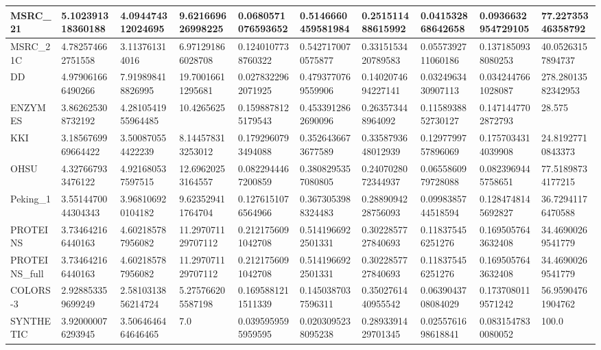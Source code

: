 \documentclass{article}
\begin{document}
\begin{table}[!ht]
\begin{tabular}{|l|l|l|l|l|l|l|l|l|l|}
        MSRC\_21 & 5.102391318360188 & 4.094474312024695 & 9.621669626998225 & 0.0680571076593652 & 0.5146660459581984 & 0.251511488615992 & 0.041532868642658 & 0.0936632954729105 & 77.22735346358792 \\ \hline
        MSRC\_21C & 4.782574662751558 & 3.113761314016 & 6.971291866028708 & 0.1240107738760322 & 0.5427170070575877 & 0.3315153420789583 & 0.0557392711060186 & 0.1371850938080253 & 40.05263157894737 \\ \hline
        DD & 4.979061666490266 & 7.919898418826995 & 19.70016611295681 & 0.0278322962071925 & 0.4793770769559906 & 0.1402074694227141 & 0.0324963430907113 & 0.0342447661028087 & 278.28013582342953 \\ \hline
        ENZYMES & 3.862625308732192 & 4.2810541955964485 & 10.4265625 & 0.1598878125179543 & 0.4533912862690096 & 0.263573448964092 & 0.1158938852730127 & 0.1471447702872793 & 28.575 \\ \hline
        KKI & 3.1856769969664422 & 3.500870554422239 & 8.144578313253012 & 0.1792960793494088 & 0.3526436673677589 & 0.3358793648012939 & 0.1297799757896069 & 0.1757034314039908 & 24.81927710843373 \\ \hline
        OHSU & 4.327667933476122 & 4.921680537597515 & 12.69620253164557 & 0.0822944467200859 & 0.3808295357080805 & 0.2407028072344937 & 0.0655860979728088 & 0.0823969445758651 & 77.51898734177215 \\ \hline
        Peking\_1 & 3.5514470044304343 & 3.968106920104182 & 9.623529411764704 & 0.1276151076564966 & 0.3673053988324483 & 0.2889094228756093 & 0.0998385744518594 & 0.1284748145692827 & 36.72941176470588 \\ \hline
        PROTEINS & 3.734642166440163 & 4.602185787956082 & 11.297071129707112 & 0.2121756091042708 & 0.5141966922501331 & 0.3022857727840693 & 0.118375456251276 & 0.1695057643632408 & 34.46900269541779 \\ \hline
        PROTEINS\_full & 3.734642166440163 & 4.602185787956082 & 11.297071129707112 & 0.2121756091042708 & 0.5141966922501331 & 0.3022857727840693 & 0.118375456251276 & 0.1695057643632408 & 34.46900269541779 \\ \hline
        COLORS-3 & 2.928853359699249 & 2.5810313856214724 & 5.275766205587198 & 0.1695881211511339 & 0.1450387037596311 & 0.3502761440955542 & 0.0639043708084029 & 0.1737080119571242 & 56.95904761904762 \\ \hline
        SYNTHETIC & 3.920000076293945 & 3.5064646464646465 & 7.0 & 0.0395959595959595 & 0.0203095238095238 & 0.2893391429701345 & 0.0255761698618841 & 0.0831547830080052 & 100.0 \\ \hline

\end{tabular}
\end{table}
\end{document}
